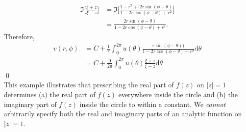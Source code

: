 \documentclass[10pt]{amsart}
\newcommand{\D}{\mathrm{d}}
\newcommand{\I}{\mathrm{i}}
\theoremstyle{nonumberplain}
\begin{document}
\begin{enumerate}[label={\bf {\arabic*}:}]
\begin{align*}
\Im \bigg[\frac {\xi + z}{\xi - z} \bigg] &= \Im \bigg[\frac {1 - r^2 + \I 2 r\sin(\phi - \theta)}{1 - 2r \cos (\phi - \theta) + r^2} \bigg] \\
	&= \frac {2 r\sin(\phi - \theta)}{1 - 2r \cos (\phi - \theta) + r^2}.
\end{align*}
Therefore, 
\begin{align*}
v(r, \phi) &= C + \frac 1 {\pi} \int_0^{2\pi} u(\theta) \frac{r\sin(\phi -\theta))}{1 - 2r \cos (\phi-\theta) + r^2} \D \theta \\
	&= C + \frac \Im {2\pi} \int_0^{2\pi} u(\theta) \frac {\xi + z}{\xi - z} \D \theta
\end{align*}
\qed \\
This example illustrates that prescribing the real part of $f(z)$ on $|z| = 1$ determines (a) the real part of $f(z)$ everywhere inside the circle and (b) the imaginary part of $f(z)$ inside the circle to within a constant.
We \textit{cannot} arbitrarily specify both the real and imaginary parts of an analytic function on $|z| = 1$.
\newpage


\end{enumerate}
\end{document}
